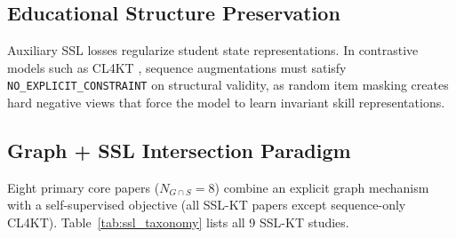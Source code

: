 \documentclass[lettersize,journal]{IEEEtran}
\begin{document}
\subsection{Educational Structure Preservation}
Auxiliary SSL losses regularize student state representations. In contrastive models such as CL4KT \cite{KT039_CL4KT_2022}, sequence augmentations must satisfy \texttt{NO\_EXPLICIT\_CONSTRAINT} on structural validity, as random item masking creates hard negative views that force the model to learn invariant skill representations.

\subsection{Graph + SSL Intersection Paradigm}
Eight primary core papers ($N_{G \cap S} = 8$) combine an explicit graph mechanism with a self-supervised objective (all SSL-KT papers except sequence-only CL4KT). Table~\ref{tab:ssl_taxonomy} lists all 9 SSL-KT studies.
\end{document}
